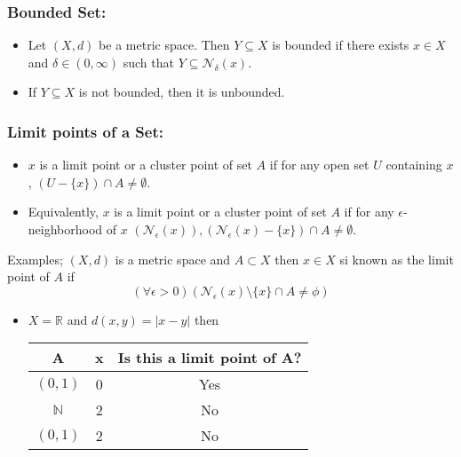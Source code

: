 \documentclass[12pt,a4paper]{article}
\begin{document}
 \subsubsection{Bounded Set:} 
\begin{itemize}
    \item Let \((X, d)\) be a metric space. Then \(Y \subseteq X\) is bounded if there exists \(x \in X\) and \(\delta \in(0, \infty)\) such that \(Y \subseteq \mathcal{N}_\delta(x)\).
    \item If \(Y \subseteq X\) is not bounded, then it is unbounded.
\end{itemize}

 \subsubsection{Limit points of a Set:} 
\begin{itemize}
    \item \(x\) is a limit point or a cluster point of set \(A\) if for any open set \(U\) containing \(x\), \((U-\{x\}) \cap A \neq \emptyset\).
    \item Equivalently, \(x\) is a limit point or a cluster point of set \(A\) if for any \(\epsilon\)-neighborhood of \(x\) \(\left(\mathcal{N}_\epsilon(x)\right),\left(\mathcal{N}_\epsilon(x)-\{x\}\right) \cap A \neq \emptyset\).
\end{itemize}
 
Examples;
\((X,d)\) is a metric space and \(A \subset X\) then \(x \in X\) si known as the limit point of \(A\) if 
    \begin{equation*}
        \left( \forall \epsilon > 0 \right)(\mathcal{N}_{\epsilon}(x)\setminus \{x\} \cap A \neq \phi) 
    \end{equation*}   
\begin{itemize}
    \item \(X = \mathbb{R}\) and \(d(x,y)=|x-y|\) then
    \begin{table}[htpb]
        \centering
        \begin{tabular}{|c|c|c|}
        \hline A & x & Is this a limit point of A?\\
        \hline \((0,1)\) & 0 & Yes \\
        \hline \(\mathbb{N}\) & 2 & No \\
        \hline \((0,1)\) & 2 & No \\
        \hline    
        \end{tabular}
    \end{table}         
\end{itemize}
\end{document}
